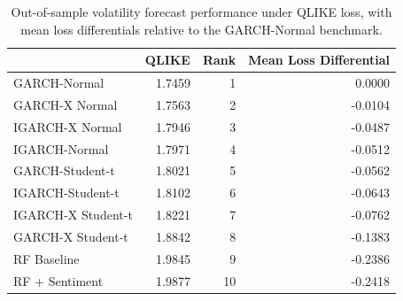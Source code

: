 \begin{table}
\caption{Out-of-sample volatility forecast performance under QLIKE loss, with mean loss differentials relative to the GARCH-Normal benchmark.}
\label{tab:forecast_qlike_ranking}
\begin{tabular}{lrrr}
\toprule
 & QLIKE & Rank & Mean Loss Differential \\
\midrule
GARCH-Normal & 1.7459 & 1 & 0.0000 \\
GARCH-X Normal & 1.7563 & 2 & -0.0104 \\
IGARCH-X Normal & 1.7946 & 3 & -0.0487 \\
IGARCH-Normal & 1.7971 & 4 & -0.0512 \\
GARCH-Student-t & 1.8021 & 5 & -0.0562 \\
IGARCH-Student-t & 1.8102 & 6 & -0.0643 \\
IGARCH-X Student-t & 1.8221 & 7 & -0.0762 \\
GARCH-X Student-t & 1.8842 & 8 & -0.1383 \\
RF Baseline & 1.9845 & 9 & -0.2386 \\
RF + Sentiment & 1.9877 & 10 & -0.2418 \\
\bottomrule
\end{tabular}
\end{table}
